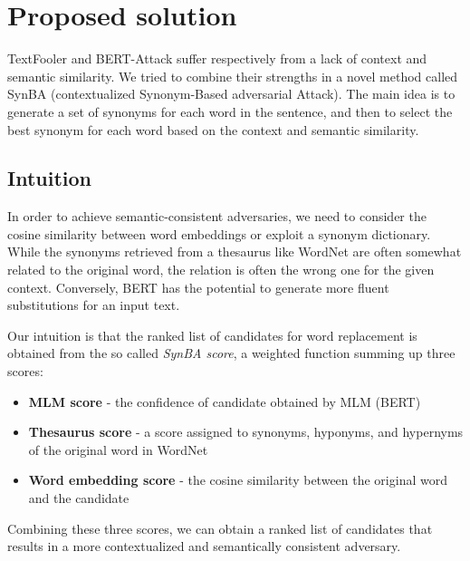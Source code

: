 \section{Proposed solution}\label{sec:proposed-solution}

TextFooler and BERT-Attack suffer respectively from a lack of context and semantic similarity. 
We tried to combine their strengths in a novel method called SynBA (contextualized Synonym-Based adversarial Attack).
The main idea is to generate a set of synonyms for each word in the sentence, and then to select the best synonym for each word based on the context and semantic similarity.


\subsection{Intuition}\label{subsec:intuition}

In order to achieve semantic-consistent adversaries, we need to consider the cosine similarity between word embeddings or exploit a synonym dictionary.
While the synonyms retrieved from a thesaurus like WordNet are often somewhat related to the original word, the relation is often the wrong one for the given context.
Conversely, BERT has the potential to generate more fluent substitutions for an input text.

Our intuition is that the ranked list of candidates for word replacement is obtained from the so called \emph{SynBA score}, a weighted function summing up three scores:
\begin{itemize}
    \item \textbf{MLM score} - the confidence of candidate obtained by MLM (BERT)
    \item \textbf{Thesaurus score} - a score assigned to synonyms, hyponyms, and hypernyms of the original word in WordNet
    \item \textbf{Word embedding score} - the cosine similarity between the original word and the candidate
\end{itemize}

Combining these three scores, we can obtain a ranked list of candidates that results in a more contextualized and semantically consistent adversary.


